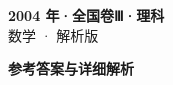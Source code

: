 \documentclass[zihao=-4, a4paper]{ctexart}
\begin{document}
\begin{center}
  {\Large\bfseries 2004 年·全国卷Ⅲ·理科}\\[4pt]
  {\large 数学 · 解析版}
\end{center}
\medskip
{}

\clearpage
{}
\begin{center}{\Large\bfseries 参考答案与详细解析}\end{center}
\medskip

\end{document}
